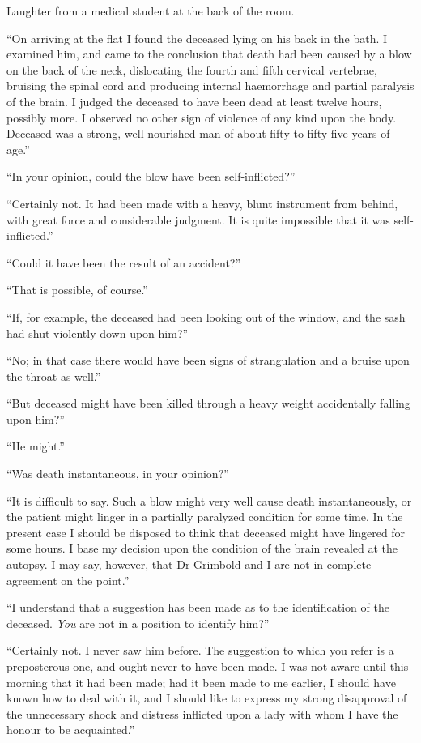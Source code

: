 Laughter from a medical student at the back of the room.

\enquote{On arriving at the flat I found the deceased lying on his back in the bath. I examined him, and came to the conclusion that death had been caused by a blow on the back of the neck, dislocating the fourth and fifth cervical vertebrae, bruising the spinal cord and producing internal haemorrhage and partial paralysis of the brain. I judged the deceased to have been dead at least twelve hours, possibly more. I observed no other sign of violence of any kind upon the body. Deceased was a strong, well-nourished man of about fifty to fifty-five years of age.}

\enquote{In your opinion, could the blow have been self-inflicted?}

\enquote{Certainly not. It had been made with a heavy, blunt instrument from behind, with great force and considerable judgment. It is quite impossible that it was self-inflicted.}

\enquote{Could it have been the result of an accident?}

\enquote{That is possible, of course.}

\enquote{If, for example, the deceased had been looking out of the window, and the sash had shut violently down upon him?}

\enquote{No; in that case there would have been signs of strangulation and a bruise upon the throat as well.}

\enquote{But deceased might have been killed through a heavy weight accidentally falling upon him?}

\enquote{He might.}

\enquote{Was death instantaneous, in your opinion?}

\enquote{It is difficult to say. Such a blow might very well cause death instantaneously, or the patient might linger in a partially paralyzed condition for some time. In the present case I should be disposed to think that deceased might have lingered for some hours. I base my decision upon the condition of the brain revealed at the autopsy. I may say, however, that Dr Grimbold and I are not in complete agreement on the point.}

\enquote{I understand that a suggestion has been made as to the identification of the deceased. \textit{You} are not in a position to identify him?}

\enquote{Certainly not. I never saw him before. The suggestion to which you refer is a preposterous one, and ought never to have been made. I was not aware until this morning that it had been made; had it been made to me earlier, I should have known how to deal with it, and I should like to express my strong disapproval of the unnecessary shock and distress inflicted upon a lady with whom I have the honour to be acquainted.}


